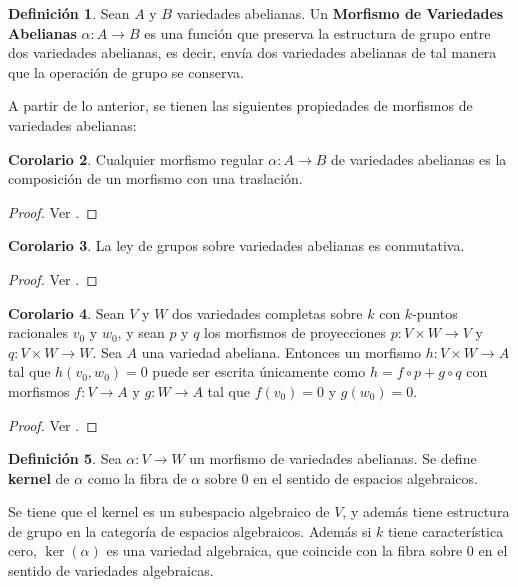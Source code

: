 \documentclass[10pt]{amsart}
\theoremstyle{definition}
\newtheorem{definition}{Definici\'on}[section]
\newtheorem{cor}[definition]{Corolario}
\theoremstyle{remark}
\theoremstyle{definition}
\begin{document}
\begin{definition} Sean $A$ y $B$ variedades abelianas. Un \textbf{Morfismo de Variedades Abelianas} $\alpha: A \rightarrow B$ es una función que preserva la estructura de grupo entre dos variedades abelianas, es decir, envía dos variedades abelianas de tal manera que la operación de grupo se conserva.
\end{definition}

A partir de lo anterior, se tienen las siguientes propiedades de morfismos de variedades abelianas:

\begin{cor} Cualquier morfismo regular $\alpha:A \rightarrow B$ de variedades abelianas es la composición de un morfismo con una traslación.
\end{cor}
\begin{proof}
Ver \cite[Cor.1.2]{Mil}.
\end{proof}

\begin{cor} La ley de grupos sobre variedades abelianas es conmutativa.
\end{cor}
\begin{proof}
Ver \cite[Cor. 1.4]{Mil}.
\end{proof}

\begin{cor} Sean $V$ y $W$ dos variedades completas sobre $\mathit{k}$ con $\mathit{k}$-puntos racionales $v_{0}$ y $w_{0}$, y sean $p$ y $q$ los morfismos de proyecciones $p:V \times W \rightarrow V$ y $q:V \times W \rightarrow W$. Sea $A$ una variedad abeliana. Entonces un morfismo $h:V \times W \rightarrow A$ tal que $h(v_{0},w_{0})=0$ puede ser escrita únicamente como $h=f \circ p + g \circ q$ con morfismos $f:V \rightarrow A$ y $g:W \rightarrow A$ tal que $f(v_0)=0$ y $g(w_{0})=0$.
\end{cor}

\begin{proof}
Ver \cite[Cor. 1.5]{Mil}.
\end{proof}

\begin{definition} Sea $\alpha:V \rightarrow W$ un morfismo de variedades abelianas. Se define \textbf{kernel} de $\alpha$ como la fibra de $\alpha$ sobre $0$ en el sentido de espacios algebraicos. 
\end{definition}

Se tiene que el kernel es un subespacio algebraico de $V$, y además tiene estructura de grupo en la categoría de espacios algebraicos. Además si $\mathit{k}$ tiene característica cero, $\ker(\alpha)$ es una variedad algebraica, que coincide con la fibra sobre $0$ en el sentido de variedades algebraicas.
\end{document}
